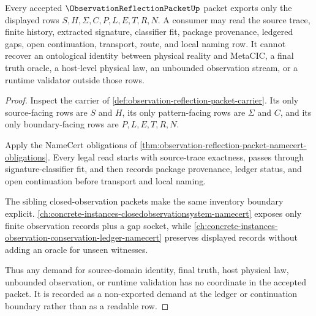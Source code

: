 \begin{theorem}
\label{thm:observation-reflection-packet-nonescape}
Every accepted $\ObservationReflectionPacketUp$ packet exports only the displayed rows $S,H,\Sigma,C,P,L,E,T,R,N$. A consumer may read the source trace, finite history, extracted signature, classifier fit, package provenance, ledgered gaps, open continuation, transport, route, and local naming row. It cannot recover an ontological identity between physical reality and MetaCIC, a final truth oracle, a host-level physical law, an unbounded observation stream, or a runtime validator outside those rows.
\end{theorem}
\begin{proof}
Inspect the carrier of \autoref{def:observation-reflection-packet-carrier}. Its only source-facing rows are $S$ and $H$, its only pattern-facing rows are $\Sigma$ and $C$, and its only boundary-facing rows are $P,L,E,T,R,N$.

Apply the NameCert obligations of \autoref{thm:observation-reflection-packet-namecert-obligations}. Every legal read starts with source-trace exactness, passes through signature-classifier fit, and then records package provenance, ledger status, and open continuation before transport and local naming.

The sibling closed-observation packets make the same inventory boundary explicit. \autoref{ch:concrete-instances-closedobservationsystem-namecert} exposes only finite observation records plus a gap socket, while \autoref{ch:concrete-instances-observation-conservation-ledger-namecert} preserves displayed records without adding an oracle for unseen witnesses.

Thus any demand for source-domain identity, final truth, host physical law, unbounded observation, or runtime validation has no coordinate in the accepted packet. It is recorded as a non-exported demand at the ledger or continuation boundary rather than as a readable row.
\end{proof}

